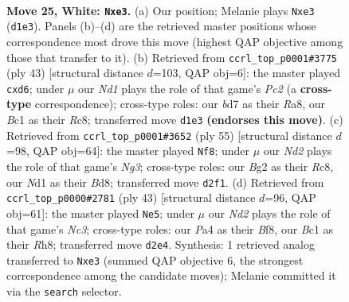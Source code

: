 \documentclass[11pt]{article}
\begin{document}
\clearpage

\begin{figure}[p]\centering
\begin{subfigure}{0.46\textwidth}\centering
\resizebox{\linewidth}{!}{%
\newchessgame
\chessboard[
  setfen={1n3rk1/r2b2b1/5n2/pP2p3/P1P3p1/4p1P1/3NRPB1/1RBN2K1 w - - 0 25},
  showmover=false,
  pgfstyle=straightmove, color=movearrow, markmove={d1-e3}
]}
\caption{}
\end{subfigure}\hfill
\begin{subfigure}{0.46\textwidth}\centering
\resizebox{\linewidth}{!}{%
\newchessgame
\chessboard[
  setfen={r1r5/2p1kp2/3Pb2p/3n2p1/p2PNp2/Np6/1P4PP/R1B1R1K1 b - - 0 22},
  showmover=false,
  pgfstyle=straightmove, color=movearrow, markmove={c7-d6}
]}
\caption{}
\end{subfigure}
\\[4pt]
\begin{subfigure}{0.46\textwidth}\centering
\resizebox{\linewidth}{!}{%
\newchessgame
\chessboard[
  setfen={2rbn1k1/1r3ppp/1P2p1n1/3p1P2/3BN3/1P2P2P/3R2P1/1B1R2K1 b - - 0 28},
  showmover=false,
  pgfstyle=straightmove, color=movearrow, markmove={g6-f8}
]}
\caption{}
\end{subfigure}\hfill
\begin{subfigure}{0.46\textwidth}\centering
\resizebox{\linewidth}{!}{%
\newchessgame
\chessboard[
  setfen={2kr1b1r/1p3bpp/pnn2p2/3P4/1pP5/1N5P/1PN2RP1/R1B2BK1 b - - 0 22},
  showmover=false,
  pgfstyle=straightmove, color=movearrow, markmove={c6-e5}
]}
\caption{}
\end{subfigure}
\caption{\textbf{Move 25, White: \texttt{Nxe3}.} (a) Our position; Melanie plays \texttt{Nxe3} (\texttt{d1e3}). Panels (b)--(d) are the retrieved master positions whose correspondence most drove this move (highest QAP objective among those that transfer to it). (b) Retrieved from \texttt{ccrl\_top\_p0001\#3775} (ply 43) [structural distance $d$=103, QAP obj=6]: the master played \texttt{cxd6}; under $\mu$ our \emph{Nd1} plays the role of that game's \emph{Pc2} (a \textbf{cross-type} correspondence); cross-type roles: our \emph{b}d7 as their \emph{R}a8, our \emph{B}c1 as their \emph{R}c8; transferred move \texttt{d1e3} \textbf{(endorses this move)}. (c) Retrieved from \texttt{ccrl\_top\_p0001\#3652} (ply 55) [structural distance $d$=98, QAP obj=64]: the master played \texttt{Nf8}; under $\mu$ our \emph{Nd2} plays the role of that game's \emph{Ng3}; cross-type roles: our \emph{B}g2 as their \emph{R}c8, our \emph{N}d1 as their \emph{B}d8; transferred move \texttt{d2f1}. (d) Retrieved from \texttt{ccrl\_top\_p0000\#2781} (ply 43) [structural distance $d$=96, QAP obj=61]: the master played \texttt{Ne5}; under $\mu$ our \emph{Nd2} plays the role of that game's \emph{Nc3}; cross-type roles: our \emph{P}a4 as their \emph{B}f8, our \emph{B}c1 as their \emph{R}h8; transferred move \texttt{d2e4}. Synthesis: 1 retrieved analog transferred to \texttt{Nxe3} (summed QAP objective 6, the strongest correspondence among the candidate moves); Melanie committed it via the \texttt{search} selector.}
\label{fig:thought-m48}
\end{figure}
\end{document}
